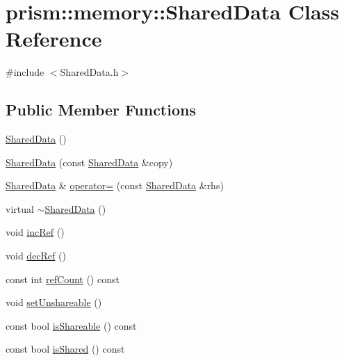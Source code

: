 \hypertarget{classprism_1_1memory_1_1_shared_data}{}\section{prism\+:\+:memory\+:\+:Shared\+Data Class Reference}
\label{classprism_1_1memory_1_1_shared_data}


{\ttfamily \#include $<$Shared\+Data.\+h$>$}

\subsection*{Public Member Functions}
\begin{DoxyCompactItemize}
\item 
\hyperlink{classprism_1_1memory_1_1_shared_data_ac79d17d38937b630c07ff1a228269e5d}{Shared\+Data} ()
\item 
\hyperlink{classprism_1_1memory_1_1_shared_data_ad473b3111b5da23be5e8e0edda370fef}{Shared\+Data} (const \hyperlink{classprism_1_1memory_1_1_shared_data}{Shared\+Data} \&copy)
\item 
\hyperlink{classprism_1_1memory_1_1_shared_data}{Shared\+Data} \& \hyperlink{classprism_1_1memory_1_1_shared_data_a43ef2a146c9788b27e7deea9ea9515f0}{operator=} (const \hyperlink{classprism_1_1memory_1_1_shared_data}{Shared\+Data} \&rhs)
\item 
virtual \hyperlink{classprism_1_1memory_1_1_shared_data_a65f0be2eead2e5b90047a22ddef65b65}{$\sim$\+Shared\+Data} ()
\item 
void \hyperlink{classprism_1_1memory_1_1_shared_data_aa16c5289dd21c5f46bdfc4adeed4512f}{inc\+Ref} ()
\item 
void \hyperlink{classprism_1_1memory_1_1_shared_data_a0a34ad897850178207793ccc8561d492}{dec\+Ref} ()
\item 
const int \hyperlink{classprism_1_1memory_1_1_shared_data_a128ea9aca3cbbb9f823be07177459cd2}{ref\+Count} () const 
\item 
void \hyperlink{classprism_1_1memory_1_1_shared_data_a09dd9370e7f370f1306677b16acb3405}{set\+Unshareable} ()
\item 
const bool \hyperlink{classprism_1_1memory_1_1_shared_data_a89f4514948434fa071e3e35dff75fe1c}{is\+Shareable} () const 
\item 
const bool \hyperlink{classprism_1_1memory_1_1_shared_data_a756a791e1cba19f476fdc00bf892fbe6}{is\+Shared} () const 
\end{DoxyCompactItemize}



